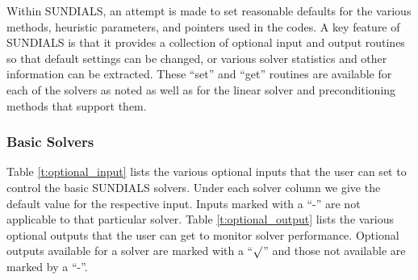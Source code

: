 Within SUNDIALS, an attempt is made to set reasonable defaults for the
various methods, heuristic parameters, and pointers used in the
codes. 
A key feature of SUNDIALS is that it provides a collection of optional
input and output routines so that default settings can be changed, or
various solver statistics and other information can be extracted.
These ``set'' and ``get'' routines are available for each of the solvers as
noted as well as for the linear solver and preconditioning methods that
support them.

\subsubsection*{Basic Solvers} 
Table \ref{t:optional_input} lists the various optional 
inputs that the user can set to control the basic SUNDIALS solvers.
Under each solver column we give the default value for the respective
input. Inputs marked with a ``-'' are not applicable to that particular 
solver. Table \ref{t:optional_output} lists the various optional 
outputs that the user can get to monitor solver performance.
Optional outputs available for a solver are marked with a ``$\surd$''
and those not available are marked by a ``-''.

